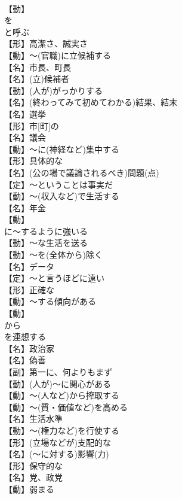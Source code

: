 \documentclass[8pt]{extreport}
\begin{document}
\begin{CJK}{UTF8}{min}
\\	【動】
\\	を
\\	と呼ぶ
\\	【形】高潔さ、誠実さ
\\	【動】～(官職)に立候補する
\\	【名】市長、町長
\\	【名】(立)候補者
\\	【動】(人が)がっかりする
\\	【名】(終わってみて初めてわかる)結果、結末
\\	【名】選挙
\\	【形】市[町]の
\\	【名】議会
\\	【動】～に(神経など)集中する
\\	【形】具体的な
\\	【名】(公の場で議論されるべき)問題(点)
\\	【定】～ということは事実だ
\\	【動】～(収入など)で生活する
\\	【名】年金
\\	【動】
\\	に～するように強いる
\\	【動】～な生活を送る
\\	【動】～を(全体から)除く
\\	【名】データ
\\	【定】～と言うほどに遠い
\\	【形】正確な
\\	【動】～する傾向がある
\\	【動】
\\	から
\\	を連想する
\\	【名】政治家
\\	【名】偽善
\\	【副】第一に、何よりもまず
\\	【動】(人が)～に関心がある
\\	【動】～(人など)から搾取する
\\	【動】～(質・価値など)を高める
\\	【名】生活水準
\\	【動】～(権力など)を行使する
\\	【形】(立場などが)支配的な
\\	【名】(～に対する)影響(力)
\\	【形】保守的な
\\	【名】党、政党
\\	【動】弱まる

\end{CJK}
\end{document}
